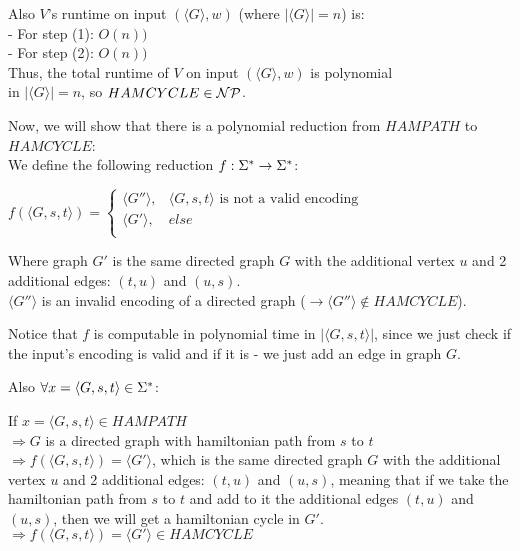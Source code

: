 Also $V$'s runtime on input $(\langle G \rangle, w)$
(where $|\langle G \rangle|=n$) is: \\
- For step (1): $O(n))$  \\
- For step (2): $O(n))$  \\
Thus, the total runtime of $V$ on input  $(\langle G \rangle, w)$ is polynomial \\
in $|\langle G \rangle|=n$, so \underline{$HAMCYCLE \in \mathcal{N}\mathcal{P}$}. \\

\pagebreak

Now, we will show that there is a polynomial reduction from $HAMPATH$ to $HAMCYCLE$: \\
We define the following reduction $f: \Sigma^* \rightarrow \Sigma^*$:

$
    f(\langle G, s, t \rangle) =
    \begin{cases}
        \langle G'' \rangle, & \langle G, s, t \rangle \text{ is not a valid encoding } \\
        \langle G' \rangle,  & else                                                     \\
    \end{cases}
$

Where graph $G'$ is the same directed graph $G$ with the additional vertex $u$ and 2 additional edges: $(t, u)$ and $(u, s)$. \\
$\langle G'' \rangle$ is an invalid encoding of a directed graph ($\rightarrow \langle G'' \rangle \notin HAMCYCLE$).

Notice that $f$ is computable in polynomial time in $|\langle G, s, t \rangle|$, since we just check
if the input's encoding is valid and if it is - we just add an edge in graph $G$.

Also $\forall x = \langle  G, s, t \rangle \in \Sigma^*$:

If $x = \langle  G, s, t \rangle \in HAMPATH$ \\
$\Rightarrow G$ is a directed graph with hamiltonian path from $s$ to $t$ \\
$\Rightarrow f(\langle  G, s, t \rangle) = \langle G' \rangle$, which is the same directed
graph $G$ with the additional vertex $u$ and 2 additional edges: $(t, u)$ and $(u, s)$,
meaning that if we take the hamiltonian path from $s$ to $t$ and add to it the additional edges $(t, u)$ and $(u, s)$,
then we will get a hamiltonian cycle in $G'$. \\
$\Rightarrow f(\langle  G, s, t \rangle) = \langle G' \rangle \in HAMCYCLE$ \\

